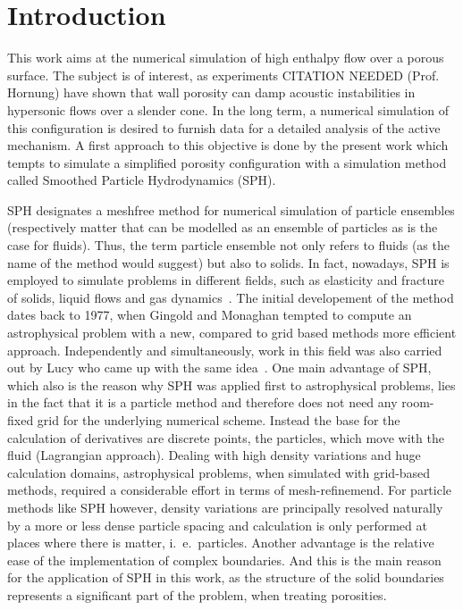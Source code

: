 \documentclass{report}
\begin{document}
%
%



\tableofcontents
\chapter{Introduction}
\label{sec:intro}


This work aims at the numerical simulation of high enthalpy flow over a porous
surface. The subject is of interest, as experiments CITATION
NEEDED (Prof. Hornung) have shown that wall porosity can damp
acoustic instabilities in hypersonic flows over a slender cone. In the long term, a numerical simulation of this configuration is desired to furnish data for a detailed
analysis of the active mechanism. A first approach to this objective is done by the present work which tempts to simulate a simplified porosity configuration with a simulation method called Smoothed Particle Hydrodynamics (SPH). 

SPH designates a meshfree method for numerical simulation of particle
ensembles (respectively matter that can be modelled as an ensemble of
particles as is the case for fluids).
Thus, the term particle ensemble not only refers
to fluids (as the name of the method would suggest) but also to solids. In
fact, nowadays, SPH is employed to simulate problems in different fields,
such as elasticity and fracture of solids, liquid flows and gas
dynamics~\cite{Monaghan2005}.
The initial developement of the method dates back to 1977, when Gingold and
Monaghan \cite{Gingold1977} tempted to compute an astrophysical %
problem with a new, compared to grid based methods more efficient approach. Independently and simultaneously, work in this field was also carried out by Lucy who came up with the same idea~\cite{Lucy1977}. One main advantage of SPH, which also is the reason why SPH was applied first to astrophysical problems, lies in the fact that it is a particle method and therefore does not need any room-fixed grid for the underlying numerical scheme. Instead the base for the calculation of derivatives are discrete points, the particles, which move with the fluid (Lagrangian approach). Dealing with high density variations and huge calculation domains, astrophysical problems, when simulated with grid-based methods, 
required a considerable effort in terms of mesh-refinemend. For particle methods like SPH however, density variations are principally resolved naturally by a more or less dense particle spacing and calculation is only performed at places where there is matter, i.\ e.\ particles.
Another advantage is the relative ease of the
implementation of complex boundaries. And this is the main reason for the application of SPH in this work, as the structure of the solid boundaries represents a significant part of the problem, when treating porosities. 
 
\end{document}
